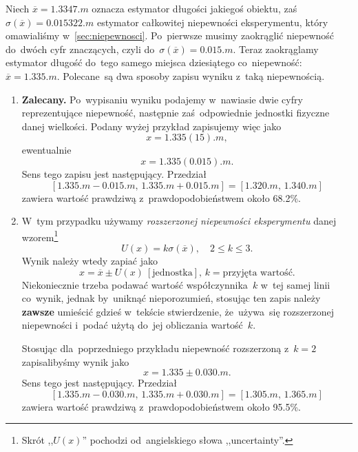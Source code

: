 \documentclass[a4paper,11pt]{article}
\newcommand{\tb}{\textbf}
\begin{document}
Niech $\overline{x} = 1.3347 \si{.m}$ oznacza estymator długości
jakiegoś obiektu, zaś $\sigma( \overline{x} ) = 0.015322 \si{.m}$
estymator całkowitej niepewności eksperymentu, który omawialiśmy
w~\eqref{sec:niepewnosci}. Po~pierwsze musimy zaokrąglić niepewność
do~dwóch cyfr znaczących, czyli
do~$\sigma( \overline{x} ) = 0.015 \si{.m}$. Teraz zaokrąglamy
estymator długość do~tego samego miejsca dziesiątego co~niepewność:
$\overline{x} = 1.335 \si{.m}$. Polecane~są dwa sposoby zapisu wyniku
z~taką niepewnością.
\begin{enumerate}
\item \tb{Zalecany.} Po~wypisaniu wyniku podajemy w~nawiasie dwie
  cyfry reprezentujące niepewność, następnie zaś~odpowiednie jednostki
  fizyczne danej wielkości. Podany wyżej przykład zapisujemy więc jako
  \begin{equation}
    \label{eq:8}
    x = 1.335(15) \si{.m},
  \end{equation}
  ewentualnie
  \begin{equation}
    \label{eq:9}
    x = 1.335(0.015) \si{.m}.
  \end{equation}
  Sens tego zapisu jest następujący. Przedział
  \begin{equation}
    \label{eq:10}
    [ 1.335 \si{.m} - 0.015 \si{.m},\, 1.335 \si{.m} + 0.015 \si{.m} ]
    = [ 1.320 \si{.m},\, 1.340 \si{.m} ]
  \end{equation}
  zawiera wartość prawdziwą z~prawdopodobieństwem około 68.2\%.
\item W~tym przypadku używamy \emph{rozszerzonej niepewności
    eksperymentu} danej wzorem\footnote{Skrót ,,$U( x )$'' pochodzi
    od~angielskiego słowa ,,uncertainty''.}
  \begin{equation}
    \label{eq:11}
    U( x ) = k \sigma( \overline{ x } ), \quad 2 \leq k \leq 3.
  \end{equation}
  Wynik należy wtedy zapiać jako
  \begin{equation}
    \label{eq:12}
    x = \overline{x} \pm U( x )\: [\textrm{jednostka}],\,
    k = \textrm{przyjęta wartość}.
  \end{equation}
  Niekoniecznie trzeba podawać wartość współczynnika~$k$ w~tej samej
  linii co~wynik, jednak by~uniknąć nieporozumień, stosując ten zapis
  należy \tb{zawsze} umieścić gdzieś w~tekście stwierdzenie,
  że~używa~się rozszerzonej niepewności i~podać użytą do~jej
  obliczania wartość~$k$.

  Stosując dla~poprzedniego przykładu niepewność rozszerzoną z~$k = 2$
  zapisalibyśmy wynik jako
  \begin{equation}
    \label{eq:13}
    x = 1.335 \pm 0.030 \si{.m}.
  \end{equation}
  Sens tego jest następujący. Przedział
  \begin{equation}
    \label{eq:14}
    [ 1.335 \si{.m} - 0.030 \si{.m},\, 1.335 \si{.m} + 0.030 \si{.m} ]
    = [ 1.305 \si{.m},\, 1.365 \si{.m} ]
  \end{equation}
  zawiera wartość prawdziwą z~prawdopodobieństwem około 95.5\%.


\end{enumerate}
\end{document}
